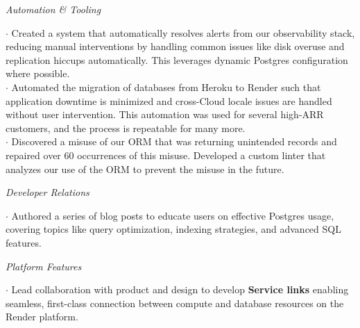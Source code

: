 \documentclass[]{clean-resume}
\begin{document}
{    \textit{Automation \& Tooling}
    \begin{addmargin}[1em]{0em}
      \phantom{~~}\hspace{-1em}$\cdot$ Created a system that automatically resolves alerts from our observability stack, reducing manual interventions by handling common issues like disk overuse and replication hiccups automatically. This leverages dynamic Postgres configuration where possible. \\
      \phantom{~~}\hspace{-1em}$\cdot$ Automated the migration of databases from Heroku to Render such that application downtime is minimized and cross-Cloud locale issues are handled without user intervention. This automation was used for several high-ARR customers, and the process is repeatable for many more. \\
      \phantom{~~}\hspace{-1em}$\cdot$ Discovered a misuse of our ORM that was returning unintended records and repaired over 60 occurrences of this misuse. Developed a custom linter that analyzes our use of the ORM to prevent the misuse in the future.
    \end{addmargin}

    \textit{Developer Relations}
    \begin{addmargin}[1em]{0em}
      \phantom{~~}\hspace{-1em}$\cdot$ Authored a series of blog posts to educate users on effective Postgres usage, covering topics like query optimization, indexing strategies, and advanced SQL features.
    \end{addmargin}

    \textit{Platform Features}
    \begin{addmargin}[1em]{0em}
      \phantom{~~}\hspace{-1em}$\cdot$ Lead collaboration with product and design to develop \textbf{Service links} enabling seamless, first-class connection between compute and database resources on the Render platform.
    \end{addmargin}
  }
\end{document}

